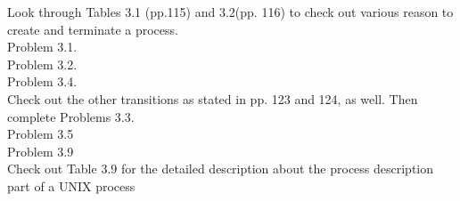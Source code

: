 \documentclass[12pt]{amsart}
\begin{document}
Look through Tables 3.1 (pp.115) and 3.2(pp. 116) to check out various reason to create and terminate a process. \\
Problem 3.1. \\
Problem 3.2. \\
Problem 3.4. \\
Check out the other transitions as stated in pp. 123 and 124, as well. Then complete Problems 3.3. \\
Problem 3.5 \\
Problem 3.9 \\
Check out Table 3.9 for the detailed description about the process description part of a UNIX process \\
\end{document}
